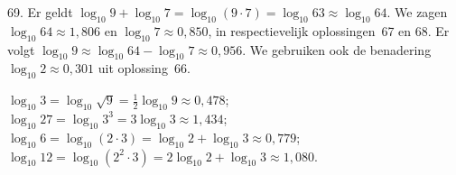 \begin{problem}{69.}
	Er geldt $\log_{10} 9 + \log_{10} 7 = \log_{10} (9 \cdot 7) = \log_{10} 63 \approx \log_{10} 64$. We zagen $\log_{10} 64 \approx 1{,}806$ en $\log_{10} 7 \approx 0{,}850$, in respectievelijk oplossin\-gen~67 en 68. Er volgt $\log_{10} 9 \approx \log_{10} 64 - \log_{10} 7 \approx 0{,}956$. We gebruiken ook de benadering $\log_{10} 2 \approx 0{,}301$ uit oplossing~66.

\noindent $\log_{10} 3 = \log_{10} \sqrt{9} = \frac{1}{2} \log_{10} 9 \approx 0{,}478$;\\
$\log_{10} 27 = \log_{10} 3^3 = 3 \log_{10} 3 \approx 1{,}434$;\\
$\log_{10} 6 = \log_{10} (2 \cdot 3) = \log_{10} 2 + \log_{10} 3 \approx 0{,}779$;\\
$\log_{10} 12 = \log_{10} (2^2 \cdot 3) = 2 \log_{10} 2 + \log_{10} 3 \approx 1{,}080$.
\end{problem}

\clearpage

